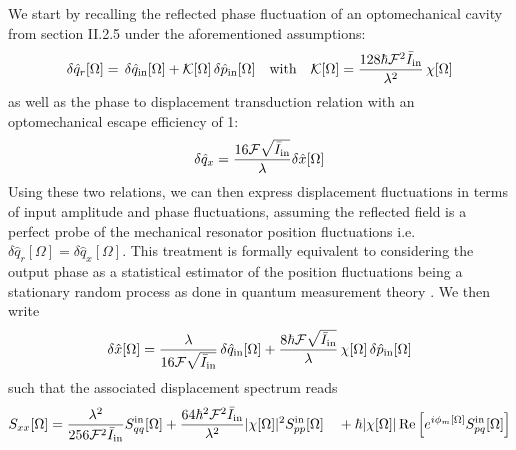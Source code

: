 We start by recalling the reflected phase fluctuation of an optomechanical cavity from section II.2.5 under the aforementioned assumptions:
\begin{equation*}
\delta \hat{q}_r[\Omega] = \, \delta \hat{q}_{\mathrm{in}}[\Omega]  + \mathcal{K}[\Omega]\, \delta \hat{p}_{\mathrm{in}}[\Omega] \quad  \text{with} \quad \mathcal{K}[\Omega] =  \dfrac{128 \hbar \mathcal{F}^2 \bar I_{\rm in}}{\lambda^2}  \,  \chi[\Omega]
\end{equation*}
as well as the phase to displacement transduction relation with an optomechanical escape efficiency of 1:
\begin{equation*}
   \delta \hat q_x = \frac{16 \mathcal{F}\sqrt{\bar I_{\rm in}}}{\lambda}\delta \hat{x}[\Omega]  
\end{equation*}
Using these two relations, we can then express displacement fluctuations in terms of input amplitude and phase fluctuations, assuming the reflected field is a perfect probe of the mechanical resonator position fluctuations i.e. $\delta \hat q_r[\Omega] = \delta \hat q_x[\Omega]$. This treatment is formally equivalent to considering the output phase as a statistical estimator of the position fluctuations being a stationary random process as done in quantum measurement theory \cite{clerk_introduction_2010}. We then write
\begin{equation}
  \delta \hat{x}[\Omega] = \frac{\lambda }{16 \mathcal{F}\sqrt{\bar I_{\rm in}}} \, \delta \hat{q}_{\mathrm{in}}[\Omega]  + \dfrac{8 \hbar \mathcal{F}\sqrt{\bar I_{\rm in}}}{\lambda} \, \chi[\Omega] \, \delta \hat{p}_{\mathrm{in}}[\Omega]
\end{equation}
such that the associated displacement spectrum reads
\begin{equation}
      S_{xx}[\Omega] = \dfrac{\lambda^2}{256 \mathcal{F}^2 \bar{I}_\mathrm{in}} S_{qq}^{\rm in}[\Omega] +  \dfrac{64 \hbar^2 \mathcal{F}^2 \bar{I}_\mathrm{in}}{\lambda^2}|\chi[\Omega]|^2 S_{pp}^{\rm in}[\Omega]  \quad  + \hbar |\chi[\Omega]| \Re\Big[  e^{i\phi_m[\Omega]} S_{pq}^{\rm in}[\Omega]\Big]
  \label{eq:total_displacement_spectrum}
\end{equation}

